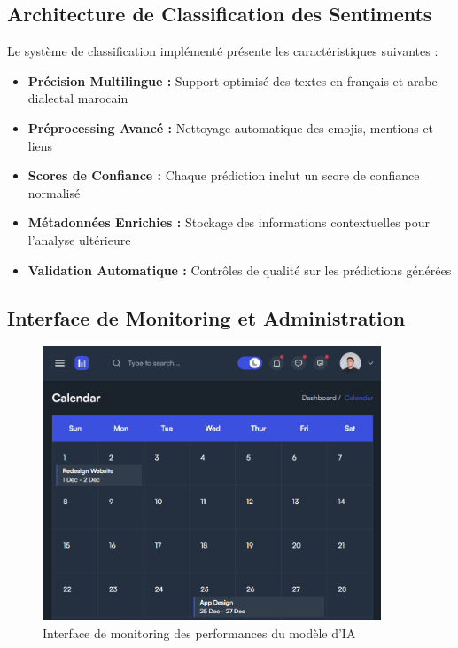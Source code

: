\subsection{Architecture de Classification des Sentiments}

Le système de classification implémenté présente les caractéristiques suivantes :

\begin{itemize}
    \item \textbf{Précision Multilingue :} Support optimisé des textes en français et arabe dialectal marocain
    \item \textbf{Préprocessing Avancé :} Nettoyage automatique des emojis, mentions et liens
    \item \textbf{Scores de Confiance :} Chaque prédiction inclut un score de confiance normalisé
    \item \textbf{Métadonnées Enrichies :} Stockage des informations contextuelles pour l'analyse ultérieure
    \item \textbf{Validation Automatique :} Contrôles de qualité sur les prédictions générées
\end{itemize}

\subsection{Interface de Monitoring et Administration}

\begin{figure}[H]
\centering
\includegraphics[width=0.9\textwidth]{assets/images/calendar.png}
\caption{Interface de monitoring des performances du modèle d'IA}
\label{fig:model-monitoring}
\end{figure}

